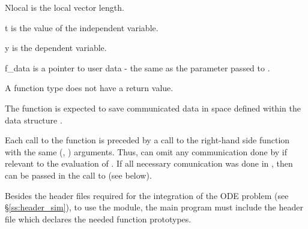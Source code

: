 {
  \begin{args}[Nlocal]
  \item[Nlocal] 
    is the local vector length.
  \item[t]
    is the value of the independent variable.
  \item[y]
    is the dependent variable. 
  \item[f\_data]
    is a pointer to user data - the same as the       
    parameter passed to .  
  \end{args}
}
{
  A  function type does not have a return value.
}
{
  The  function is expected to save communicated data in space defined
  within the data structure . 

  Each call to the  function is preceded by a call to the right-hand side
  function  with the same (, ) arguments.  Thus,  can omit 
  any communication done by  if relevant to the evaluation of .  
If all necessary comunication was done in , then 
  can be passed in the call to  (see below).
}

Besides the header files required for the integration of the ODE problem
(see \S\ref{ss:header_sim}),  to use the {\cvbbdpre} module, the main program 
must include the header file  which declares the needed
function prototypes.

